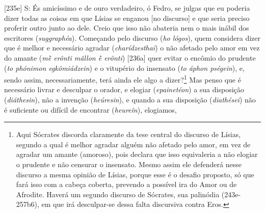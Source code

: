 {[}235e{]} S: És amicíssimo e de ouro verdadeiro, ó Fedro, se julgas que
eu poderia dizer todas as coisas em que Lísias se enganou {[}no
discurso{]} e que seria preciso proferir outro junto ao dele. Creio que
isso não abateria nem o mais inábil dos escritores (\emph{suggraphéa}).
Começando pelo discurso (\emph{ho lógos}), quem considera dizer que é
melhor e necessário agradar (\emph{charídzesthai}) o não afetado pelo
amor em vez do amante (\emph{mḕ erônti mâllon ḕ erônti}) {[}236a{]} quer
evitar o encômio do prudente (\emph{to phónimon egkômiádzein}) e o
vitupério do insensato (\emph{to áphon pségein}), e, sendo assim,
necessariamente, terá ainda ele algo a dizer?\footnote{Aqui Sócrates
  discorda claramente da tese central do discurso de Lísias, segundo a
  qual é melhor agradar alguém não afetado pelo amor, em vez de agradar
  um amante (amoroso), pois declara que isso equivaleria a não elogiar o
  prudente e não censurar o insensato. Mesmo assim ele defenderá nesse
  discurso a mesma opinião de Lísias, porque esse é o desafio proposto,
  só que fará isso com a cabeça coberta, prevendo a possível ira do Amor
  ou de Afrodite. Haverá um segundo discurso de Sócrates, sua palinódia
  (243e-257b6), em que irá desculpar-se dessa falta discursiva contra
  Eros.} Mas penso que é necessário livrar e desculpar o orador, e
elogiar (\emph{epainetéon}) a sua disposição (\emph{diáthesin}), não a
invenção (\emph{heúresin}), e quando a sua disposição (\emph{diathései})
não é suficiente ou difícil de encontrar (\emph{heureîn}), elogiamos,
